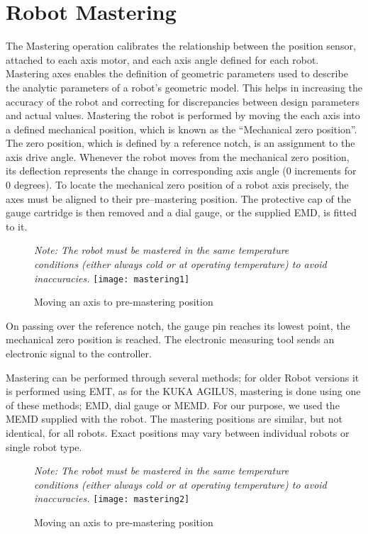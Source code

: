 	\section{Robot Mastering}
	
	The Mastering operation calibrates the relationship between the position sensor, attached to each axis motor, and each axis angle defined for each robot. Mastering axes enables the definition of geometric parameters used to describe the analytic parameters of a robot’s geometric model. This helps in increasing the accuracy of the robot and correcting for discrepancies between design parameters and actual values.
	\newline
	Mastering the robot is performed by moving the each axis into a defined mechanical position, which is known as the “Mechanical zero position”. The zero position, which is defined by a reference notch, is an assignment to the axis drive angle. Whenever the robot moves from the mechanical zero position, its deflection represents the change in corresponding axis angle (0 increments for 0 degrees).
	\newline
	To locate the mechanical zero position of a robot axis precisely, the axes must be aligned to their pre–mastering position. The protective cap of the gauge cartridge is then removed and a dial gauge, or the supplied EMD, is fitted to it. 
	\begin{figure}[H]
        \centering
                    \textit{Note: The robot must be mastered in the same temperature conditions (either always cold or at operating temperature) to avoid inaccuracies.}
		\texttt{[image: mastering1]}
        		\caption{Moving an axis to pre-mastering position}
    \end{figure}
    
	On passing over the reference notch, the gauge pin reaches its lowest point, the mechanical zero position is reached. The electronic measuring tool sends an electronic signal to the controller.
	
	Mastering can be performed through several methods; for older Robot versions it is performed using EMT, as for the KUKA AGILUS, mastering is done using one of these methods; EMD, dial gauge or MEMD. For our purpose, we used the MEMD supplied with the robot. The mastering positions are similar, but not identical, for all robots. Exact positions may vary between individual robots or single robot type. 
	\begin{figure}[H]
        \centering
        \textit{Note: The robot must be mastered in the same temperature conditions (either always cold or at operating temperature) to avoid inaccuracies.}
		\texttt{[image: mastering2]}
		\caption{Moving an axis to pre-mastering position}
    \end{figure}
	
